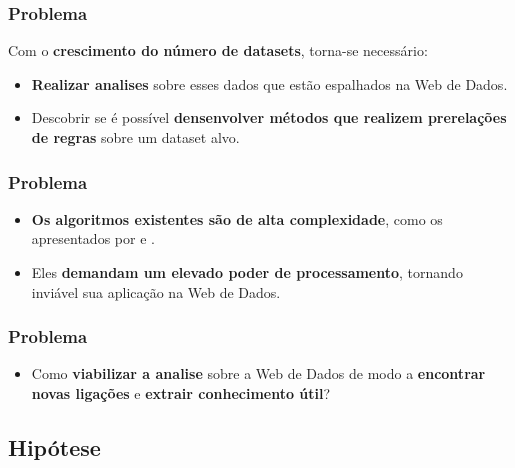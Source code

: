 \documentclass[hyperref={pdfpagelabels=false}]{beamer}
\begin{document}
\begin{frame}
	\frametitle{Problema}
Com o \textbf{crescimento do número de datasets}, torna-se necessário:
\begin{itemize}
	\item  \textbf{Realizar analises} sobre esses dados que estão espalhados na Web de Dados.
 	\item Descobrir se é possível \textbf{densenvolver métodos que realizem prerelações de regras} sobre um dataset alvo.
	\end{itemize}		
\end{frame}



\begin{frame}
	\frametitle{Problema}
	\begin{itemize}
	\item { \textbf{Os algoritmos existentes são de alta complexidade}, como os apresentados por \cite{Ramezani2014} e \cite{Elseidy2014}.}
    \item Eles \textbf{demandam um elevado poder de processamento}, tornando inviável sua aplicação na Web de Dados. 
	\end{itemize}		
\end{frame}

\begin{frame}
	\frametitle{Problema}
	\begin{itemize}
	\item {Como \textbf{viabilizar a analise} sobre a Web de Dados de modo a \textbf{encontrar novas ligações} e \textbf{extrair conhecimento útil}?}
	\end{itemize}		
\end{frame}


\subsection{Hipótese}
 
\end{document}

